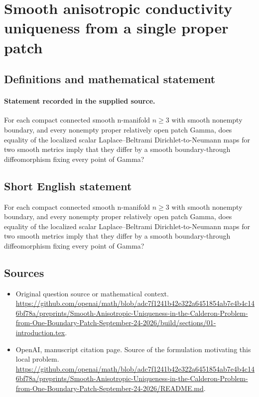 \documentclass[11pt]{article}
\begin{document}
\section*{Smooth anisotropic conductivity uniqueness from a single proper patch}\label{statement}
\subsection{Definitions and mathematical statement}
\paragraph{Statement recorded in the supplied source.}
For each compact connected smooth n-manifold $n\geq 3$ with smooth nonempty boundary, and every nonempty proper relatively open patch Gamma, does equality of the localized scalar Laplace–Beltrami Dirichlet-to-Neumann maps for two smooth metrics imply that they differ by a smooth boundary-through diffeomorphism fixing every point of Gamma?
\subsection{Short English statement}
For each compact connected smooth n-manifold $n\geq 3$ with smooth nonempty boundary, and every nonempty proper relatively open patch Gamma, does equality of the localized scalar Laplace–Beltrami Dirichlet-to-Neumann maps for two smooth metrics imply that they differ by a smooth boundary-through diffeomorphism fixing every point of Gamma?
\subsection{Sources}
\begin{itemize}
\item[S1] Original question source or mathematical context.
\url{https://github.com/openai/math/blob/adc7f1241b42e322a6451854ab7e4b4c146bf78a/preprints/Smooth-Anisotropic-Uniqueness-in-the-Calderon-Problem-from-One-Boundary-Patch-September-24-2026/build/sections/01-introduction.tex}.
\item[S2] OpenAI, manuscript citation page. Source of the formulation motivating this local problem.
\url{https://github.com/openai/math/blob/adc7f1241b42e322a6451854ab7e4b4c146bf78a/preprints/Smooth-Anisotropic-Uniqueness-in-the-Calderon-Problem-from-One-Boundary-Patch-September-24-2026/README.md}.
\end{itemize}
\end{document}
